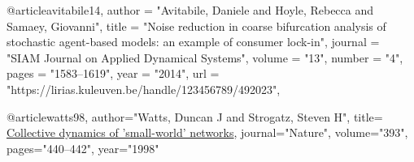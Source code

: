 @article{avitabile14,
  author = "Avitabile, Daniele and Hoyle, Rebecca and Samaey, Giovanni",
  title = "Noise reduction in coarse bifurcation analysis of stochastic agent-based models: an example of consumer lock-in",
  journal = "SIAM Journal on Applied Dynamical Systems",
  volume = "13",
  number = "4",
  pages = "1583--1619",
  year = "2014",
  url = "https://lirias.kuleuven.be/handle/123456789/492023",
}

@article{watts98,
  author="Watts, Duncan J and Strogatz, Steven H",
  title= {\href{http://www.nature.com/nature/journal/v393/n6684/pdf/393440a0.pdf} {Collective dynamics of 'small-world' networks}},
  journal="Nature",
  volume="393",
  pages="440--442",
  year="1998"
}
